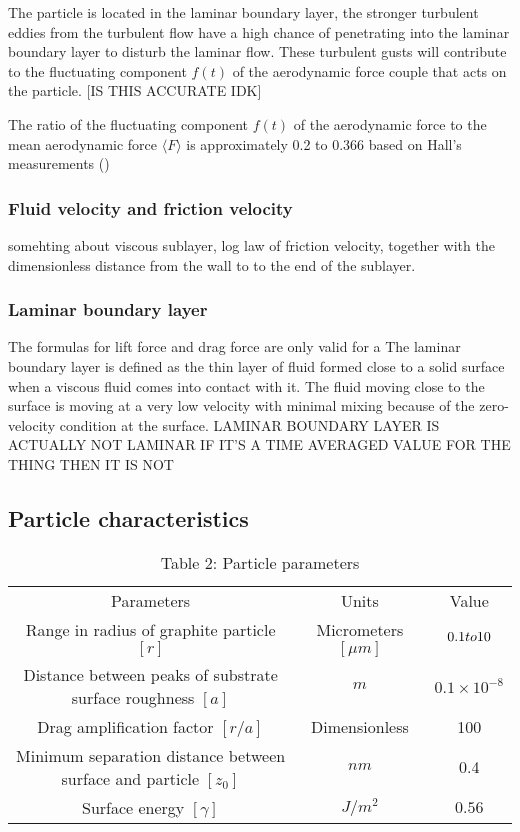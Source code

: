 \documentclass{article}
\begin{document}
The particle is located in the laminar boundary layer, the stronger turbulent eddies from the turbulent flow have a high chance of penetrating into the laminar boundary layer to disturb the laminar flow. These turbulent gusts will contribute to the fluctuating component \(f(t)\) of the aerodynamic force couple that acts on the particle. [IS THIS ACCURATE IDK]

The ratio of the fluctuating component \(f(t)\) of the aerodynamic force to the mean aerodynamic force \(\langle{F}\rangle\) is approximately 0.2 to 0.366 based on Hall's measurements (\cite{HALLD1988})

\subsubsection{Fluid velocity and friction velocity}
somehting about viscous sublayer, log law of friction velocity, together with the dimensionless distance from the wall to to the end of the sublayer.

\subsubsection{Laminar boundary layer} 
The formulas for lift force and drag force are only valid for a 
The laminar boundary layer is defined as the thin layer of fluid formed close to a solid surface when a viscous fluid comes into contact with it. The fluid moving close to the surface is moving at a very low velocity with minimal mixing because of the zero-velocity condition at the surface.
LAMINAR BOUNDARY LAYER IS ACTUALLY NOT LAMINAR 
IF IT'S A TIME AVERAGED VALUE FOR THE THING THEN IT IS NOT 

\subsection{Particle characteristics}


\begin{table}
    \centering
    \begin{tabular}{ccc}
         Parameters&  Units& Value\\
         Range in radius of graphite particle \([r]\) &  Micrometers \([\mu m]\) & \(0.1 \space to\space 10\)\\
         Distance between peaks of substrate surface roughness \([a]\) &  \(m\) & \(0.1 \times10^{-8}\)\\
         Drag amplification factor \([r/a]\) &  Dimensionless & 100\\
         Minimum separation distance between surface and particle \([z_0]\) &  \(nm\) &  0.4 \\
         Surface energy \([\gamma]\) &  \(J/m^2\) & \(0.56\) \\
    \end{tabular}
    \caption{Table 2: Particle parameters}
    \label{tab:2}
\end{table}
\end{document}
